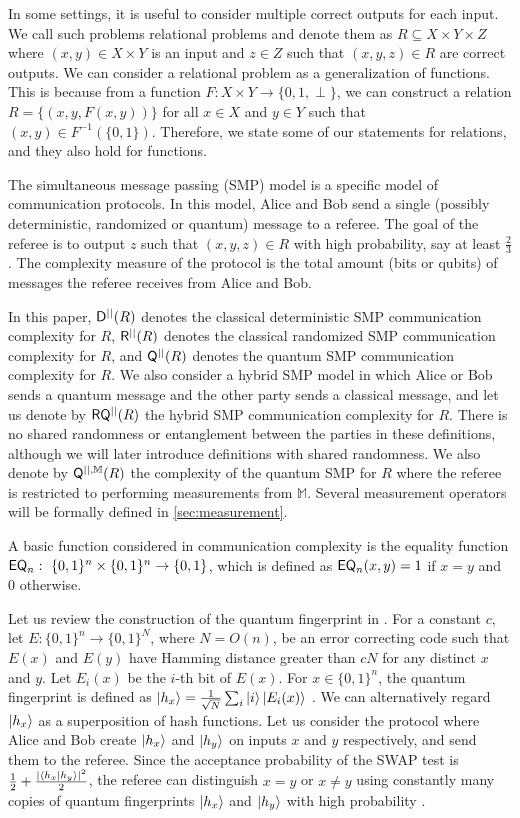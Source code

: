 In some settings, it is useful to consider multiple correct outputs for each input. We call such problems relational problems and denote them as $R \subseteq X \times Y \times Z$ where $(x,y) \in X \times Y$ is an input and $z \in Z$ such that $(x,y,z) \in R$ are correct outputs. We can consider a relational problem as a generalization of functions. This is because from a function $F : X \times Y \rightarrow \{0,1, \perp \}$, we can construct a relation $R = \{ (x,y,F(x,y)) \}$ for all $x \in X$ and $y \in Y$ such that $(x,y) \in F^{-1}(\{0,1\})$. Therefore, we state some of our statements for relations, and they also hold for functions.

The simultaneous message passing (SMP) model is a specific model of communication protocols. In this model, Alice and Bob send a single (possibly deterministic, randomized or quantum) message to a referee. The goal of the referee is to output $z$ such that $(x,y,z) \in R$ with high probability, say at least $\frac{2}{3}$. The complexity measure of the protocol is the total amount (bits or qubits) of messages the referee receives from Alice and Bob.  

In this paper, $\mathsf{D}^{||}(R)$ denotes the classical deterministic SMP communication complexity for $R$, $\mathsf{R}^{||}(R)$ denotes the classical randomized SMP communication complexity for $R$, and $\mathsf{Q}^{||}(R)$ denotes the quantum SMP communication complexity for $R$. We also consider a hybrid SMP model in which Alice or Bob sends a quantum message and the other party sends a classical message, and let us denote by $\mathsf{R}\mathsf{Q}^{||}(R)$ the hybrid SMP communication complexity for $R$. There is no shared randomness or entanglement between the parties in these definitions, although we will later introduce definitions with shared randomness. We also denote by $\mathsf{Q}^{||,\mathbb{M}}(R)$ the complexity of the quantum SMP for $R$ where the referee is restricted to performing measurements from $\mathbb{M}$. Several measurement operators will be formally defined in \cref{sec:measurement}.

A basic function considered in communication complexity is the equality function $\mathsf{EQ}_n:~\{0,1\}^n\times\{0,1\}^n\rightarrow \{0,1\}$, 
which is defined as $\mathsf{EQ}_n(x,y)=1$ if $x=y$ and $0$ otherwise.

Let us review the construction of the quantum fingerprint in \cite{BCWdW01}. For a constant $c$, let $E : \{0,1\}^n \to \{0,1\}^N$, where $N=O(n)$, be an error correcting code such that $E(x)$ and $E(y)$ have Hamming distance greater than $cN$ for any distinct $x$ and $y$. Let $E_i(x)$ be the $i$-th bit of $E(x)$. For $x \in \{0,1\}^n$, the quantum fingerprint is defined as $\ket{h_x} = \frac{1}{\sqrt{N}} \sum_i \ket{i}\ket{E_i(x)}$ \cite{BCWdW01}. We can alternatively regard $\ket{h_x}$ as a superposition of hash functions. Let us consider the protocol where Alice and Bob create $\ket{h_x}$ and $\ket{h_y}$ on inputs $x$ and $y$ respectively, and send them to the referee. Since the acceptance probability of the SWAP test is $\frac{1}{2} + \frac{|\braket{h_x | h_y}|^2}{2}$, the referee can distinguish $x=y$ or $x \neq y$ using constantly many copies of quantum fingerprints $\ket{h_x}$ and $\ket{h_y}$ with high probability \cite{BCWdW01}.

